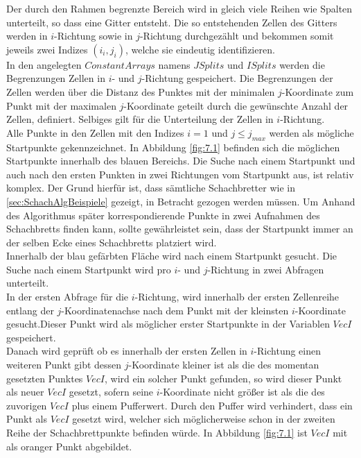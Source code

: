 Der durch den Rahmen begrenzte Bereich wird in gleich viele Reihen wie Spalten unterteilt, so dass eine Gitter entsteht. Die so entstehenden Zellen des Gitters werden in $i$-Richtung sowie in $j$-Richtung durchgezählt und bekommen somit jeweils zwei Indizes $(i_i,j_i)$, welche sie eindeutig identifizieren.\\

In den angelegten $ConstantArrays$ namens $JSplits$ und $ISplits$ werden die Begrenzungen Zellen in $i$- und $j$-Richtung gespeichert. Die Begrenzungen der Zellen werden über die Distanz des Punktes mit der minimalen $j$-Koordinate zum Punkt mit der maximalen $j$-Koordinate geteilt durch die gewünschte Anzahl der Zellen, definiert. Selbiges gilt für die Unterteilung der Zellen in $i$-Richtung. \\ 

Alle Punkte in den Zellen mit den Indizes $i=1$ und $j \leq  j_{max}$ werden als mögliche Startpunkte gekennzeichnet. In Abbildung \ref{fig:7.1} befinden sich die möglichen Startpunkte innerhalb des blauen Bereichs. Die Suche nach einem Startpunkt und auch nach den ersten Punkten in zwei Richtungen vom Startpunkt aus, ist relativ komplex. Der Grund hierfür ist, dass sämtliche Schachbretter wie in \ref{sec:SchachAlgBeispiele} gezeigt, in Betracht gezogen werden müssen. Um Anhand des Algorithmus später korrespondierende Punkte in zwei Aufnahmen des Schachbretts finden kann, sollte gewährleistet sein, dass der Startpunkt immer an der selben Ecke eines Schachbretts platziert wird.\\

Innerhalb der blau gefärbten Fläche wird nach einem Startpunkt gesucht. Die Suche nach einem Startpunkt wird pro $i$- und $j$-Richtung in zwei Abfragen unterteilt.\\

In der ersten Abfrage für die $i$-Richtung, wird innerhalb der ersten Zellenreihe entlang der $j$-Koordinatenachse nach dem Punkt mit der kleinsten $i$-Koordinate gesucht.Dieser Punkt wird als möglicher erster Startpunkte in der Variablen $VecI$ gespeichert.\\

Danach wird geprüft ob es innerhalb der ersten Zellen in $i$-Richtung einen weiteren Punkt gibt dessen $j$-Koordinate kleiner ist als die des momentan gesetzten Punktes $VecI$, wird ein solcher Punkt gefunden, so wird dieser Punkt als neuer $VecI$ gesetzt, sofern seine $i$-Koordinate nicht größer ist als die des zuvorigen $VecI$ plus einem Pufferwert. Durch den Puffer wird verhindert, dass ein Punkt als $VecI$ gesetzt wird, welcher sich möglicherweise schon in der zweiten Reihe der Schachbrettpunkte befinden würde. In Abbildung \ref{fig:7.1} ist $VecI$ mit als oranger Punkt abgebildet.\\

